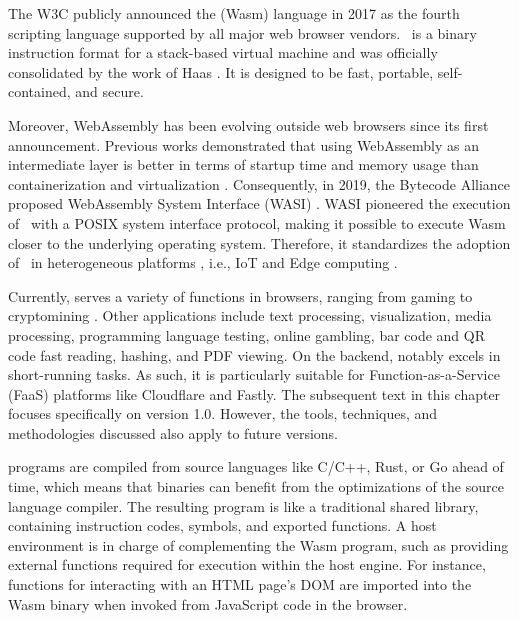 \msection{\Wasm}
\label{sota:wasm}
The W3C publicly announced the \Wasm(Wasm) language in 2017 as the fourth scripting language supported by all major web browser vendors.
\Wasm\ is a binary instruction format for a stack-based virtual machine and was officially consolidated by the work of Haas \etalp \cite{Haas_2017}. 
It is designed to be fast, portable, self-contained, and secure.


Moreover, WebAssembly has been evolving outside web browsers since its first announcement.
Previous works demonstrated that using WebAssembly as an intermediate layer is better in terms of startup time and memory usage than containerization and virtualization \cite{pMendkiServerless, 1244493Jacobsson}. 
Consequently, in 2019, the Bytecode Alliance proposed WebAssembly System Interface (WASI) \cite{WASI}. 
WASI pioneered the execution of \Wasm\ with a POSIX system interface protocol, making it possible to execute Wasm closer to the underlying operating system. 
Therefore, it standardizes the adoption of \Wasm\ in heterogeneous platforms \cite{bryant2020webassembly}, i.e., IoT and Edge computing \cite{9640153, wen2020wasmachine}.

Currently, \Wasm serves a variety of functions in browsers, ranging from gaming to cryptomining \cite{Hilbig2021AnES}. 
Other applications include text processing, visualization, media processing, programming language testing, online gambling, bar code and QR code fast reading, hashing, and PDF viewing. 
On the backend, \Wasm notably excels in short-running tasks. 
As such, it is particularly suitable for Function-as-a-Service (FaaS) platforms \cite{10.1145/3526059.3533618} like Cloudflare and Fastly.
The subsequent text in this chapter focuses specifically on \Wasm version 1.0. 
However, the tools, techniques, and methodologies discussed also apply to future \Wasm versions.

\vspace{-2cm}

\Wasm programs are compiled from source languages like C/C++, Rust, or Go ahead of time, which means that \wasm binaries can benefit from the optimizations of the source language compiler.
The resulting \Wasm program is like a traditional shared library, containing instruction codes, symbols, and exported functions. 
A host environment is in charge of complementing the Wasm program, such as providing external functions required for execution within the host engine. 
For instance, functions for interacting with an HTML page's DOM are imported into the Wasm binary when invoked from JavaScript code in the browser. 

